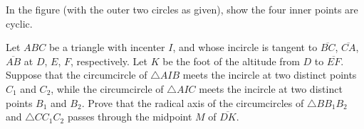 \documentclass[11pt]{scrartcl}
\begin{document}
\begin{problem}
  In the figure (with the outer two circles as given),
  show the four inner points are cyclic.
\end{problem}

\begin{problem}
Let $ABC$ be a triangle with incenter $I$, and whose incircle is tangent
to $\overline{BC}$, $\overline{CA}$, $\overline{AB}$ at $D$, $E$, $F$, respectively.
Let $K$ be the foot of the altitude from $D$ to $\overline{EF}$.
Suppose that the circumcircle of $\triangle AIB$
meets the incircle at two distinct points $C_1$ and $C_2$,
while the circumcircle of $\triangle AIC$ meets the incircle
at two distinct points $B_1$ and $B_2$.
Prove that the radical axis of the circumcircles of
$\triangle BB_1B_2$ and $\triangle CC_1C_2$ passes through the midpoint $M$ of $\overline{DK}$.
\end{problem}
\end{document}
